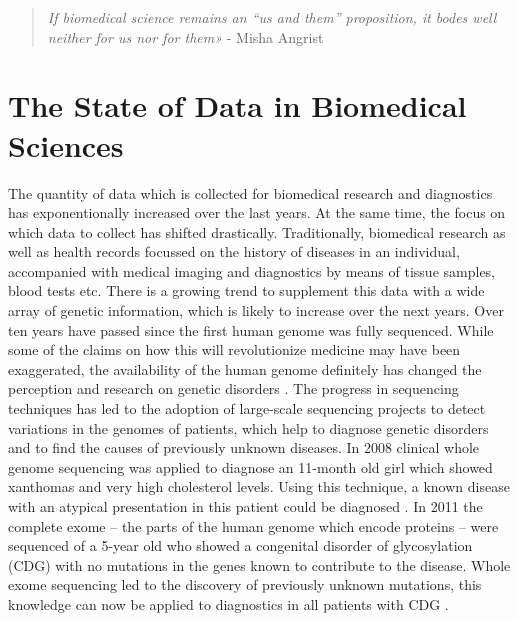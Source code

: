 \documentclass[runningheads,a4paper]{llncs}
\begin{document}
\begin{quote}
\textit{If biomedical science remains an “us and them” proposition, it bodes well neither for us nor for them»} - Misha Angrist
\end{quote}

\section{The State of Data in Biomedical Sciences}

The quantity of data which is collected for biomedical research and diagnostics has exponentionally increased over the last years. At the same time, the focus on which data to collect has shifted drastically. Traditionally, biomedical research as well as health records focussed on the history of diseases in an individual, accompanied with medical imaging and diagnostics by means of tissue samples, blood tests etc. There is a growing trend to supplement this data with a wide array of genetic information, which is likely to increase over the next years.   
Over ten years have passed since the first human genome was fully sequenced. While some of the claims on how this will revolutionize medicine may have been exaggerated, the availability of the human genome definitely has changed the perception and research on genetic disorders \cite{collins}. The progress in sequencing techniques has led to the adoption of large-scale sequencing projects to detect variations in the genomes of patients, which help to diagnose genetic disorders and to find the causes of previously unknown diseases. 
In 2008 clinical whole genome sequencing was applied to diagnose an 11-month old girl which showed xanthomas and very high cholesterol levels. Using this technique, a known disease with an atypical presentation in this patient could be diagnosed \cite{rios}. 
In 2011 the complete exome – the parts of the human genome which encode proteins – were sequenced of a 5-year old who showed a congenital disorder of glycosylation (CDG) with no mutations in the genes known to contribute to the disease. Whole exome sequencing led to the discovery of previously unknown mutations, this knowledge can now be applied to diagnostics in all patients with CDG \cite{jones}. 
\end{document}
